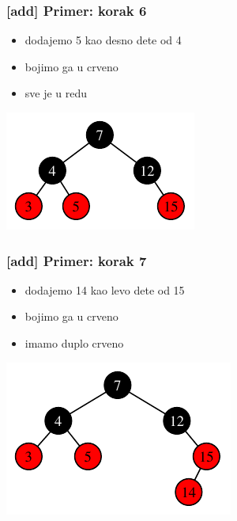 \documentclass[compress,aspectratio=169]{beamer}
\begin{document}
\begin{frame}[fragile]
  \frametitle{[add] Primer: korak 6}
  \begin{itemize}
    \item dodajemo 5 kao desno dete od 4
    \item bojimo ga u crveno
    \item sve je u redu
  \end{itemize}
  \begin{center}
    \includegraphics[scale=1.0]{asp-11-add-08.pdf}
  \end{center}
\end{frame}

\begin{frame}[fragile]
  \frametitle{[add] Primer: korak 7}
  \begin{itemize}
    \item dodajemo 14 kao levo dete od 15
    \item bojimo ga u crveno
    \item imamo duplo crveno
  \end{itemize}
  \begin{center}
    \includegraphics[scale=1.0]{asp-11-add-09.pdf}
  \end{center}
\end{frame}
\end{document}
